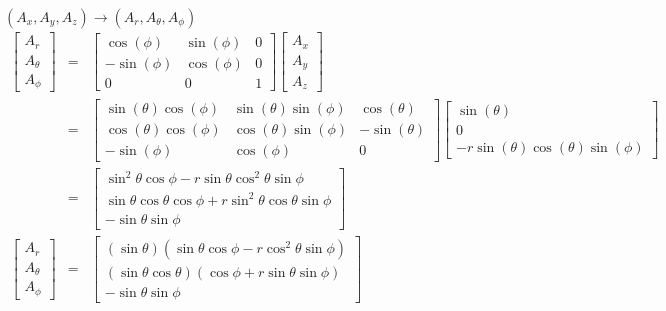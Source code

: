 \documentclass{article}
\begin{document}
$\left( A_{x},A_{y},A_{z}\right) \longrightarrow \left( A_{r},A_{\theta
},A_{\phi }\right) $ 
\begin{eqnarray*}
\left[ 
\begin{array}{c}
A_{r} \\ 
A_{\theta } \\ 
A_{\phi }%
\end{array}%
\right] &=&\left[ 
\begin{array}{ccc}
\cos \left( \phi \right) & \sin \left( \phi \right) & 0 \\ 
-\sin \left( \phi \right) & \cos \left( \phi \right) & 0 \\ 
0 & 0 & 1%
\end{array}%
\right] \left[ 
\begin{array}{c}
A_{x} \\ 
A_{y} \\ 
A_{z}%
\end{array}%
\right] \\
&=&\left[ 
\begin{array}{ccc}
\sin \left( \theta \right) \cos \left( \phi \right) & \sin \left( \theta
\right) \sin \left( \phi \right) & \cos \left( \theta \right) \\ 
\cos \left( \theta \right) \cos \left( \phi \right) & \cos \left( \theta
\right) \sin \left( \phi \right) & -\sin \left( \theta \right) \\ 
-\sin \left( \phi \right) & \cos \left( \phi \right) & 0%
\end{array}%
\right] \left[ 
\begin{array}{c}
\sin \left( \theta \right) \\ 
0 \\ 
-r\sin \left( \theta \right) \cos \left( \theta \right) \sin \left( \phi
\right)%
\end{array}%
\right] \\
&=&\left[ 
\begin{array}{c}
\sin ^{2}\theta \cos \phi -r\sin \theta \cos ^{2}\theta \sin \phi \\ 
\sin \theta \cos \theta \cos \phi +r\sin ^{2}\theta \cos \theta \sin \phi \\ 
-\sin \theta \sin \phi%
\end{array}%
\right] \allowbreak \\
\left[ 
\begin{array}{c}
A_{r} \\ 
A_{\theta } \\ 
A_{\phi }%
\end{array}%
\right] &=&\left[ 
\begin{array}{c}
\left( \sin \theta \right) \left( \sin \theta \cos \phi -r\cos ^{2}\theta
\sin \phi \right) \\ 
\left( \sin \theta \cos \theta \right) \left( \cos \phi +r\sin \theta \sin
\phi \right) \\ 
-\sin \theta \sin \phi%
\end{array}%
\right] \allowbreak
\end{eqnarray*}
\end{document}
